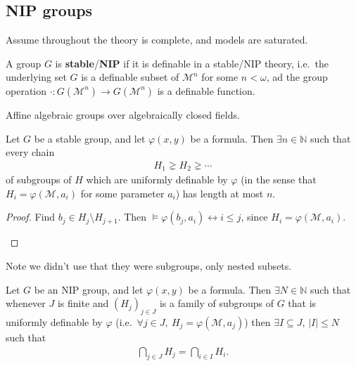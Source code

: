 \documentclass{article}
\let\models\vDash
\begin{document}
\subsection{NIP groups}
\newlec
Assume throughout the theory is complete, and models are saturated.
\begin{defi}
  A group $G$ is \textbf{stable}/\textbf{NIP} if it is definable in a stable/NIP theory, i.e.\ the underlying set $G$ is a definable subset of $\mathcal{M}^n$ for some $n < \omega$, ad the group operation $\cdot: G(\mathcal{M}^n) \to G(\mathcal{M}^n)$ is a definable function.
\end{defi}
\begin{eg}
  Affine algebraic groups over algebraically closed fields.
\end{eg}
\begin{lemma}
  Let $G$ be a stable group, and let $\varphi(x,y)$ be a formula. Then $\exists n \in \mathbb{N}$ such that every chain
  \begin{align*}
    H_1 \gneq H_2 \gneq \dotsb
  \end{align*}
  of subgroups of $H$ which are uniformly definable by $\varphi$ (in the sense that $H_i = \varphi(\mathcal{M},a_i)$ for some parameter $a_i$) has length at most $n$.
\end{lemma}
\begin{proof}
  Find $b_j \in H_j \setminus H_{j+1}$. Then $\models \varphi(b_j, a_i) \leftrightarrow i \leq j$, since $H_i = \varphi(\mathcal{M},a_i)$.
  \begin{center}
  \end{center}
\end{proof}
Note we didn't use that they were subgroups, only nested subsets.
\begin{thm}
  Let $G$ be an NIP group, and let $\varphi(x,y)$ be a formula.
  Then $\exists N \in \mathbb{N}$ such that whenever $J$ is finite and $(H_j)_{j \in J}$ is a family of subgroups of $G$ that is uniformly definable by $\varphi$ (i.e.\ $\forall j \in J,\ H_j = \varphi(\mathcal{M},a_j)$) then $\exists I \subseteq J$, $|I| \leq N$ such that
  \begin{align*}
    \bigcap_{j \in J} H_j = \bigcap_{i \in I} H_i.
  \end{align*}
\end{thm}
\end{document}
